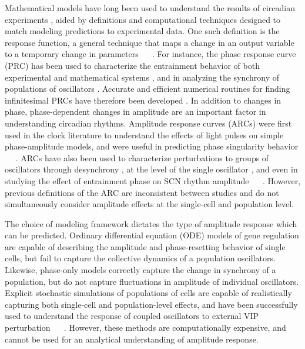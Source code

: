 \documentclass[11pt, letterpaper]{article}
\providecommand{\DIFadd}[1]{{\protect\color{blue}#1}} %
\providecommand{\DIFaddbegin}{} %
\providecommand{\DIFaddend}{} %
\begin{document}
Mathematical models have long been used to \DIFaddbegin \DIFadd{understand }\DIFaddend the results of circadian experiments \cite{Leloup2003, Becker-Weimann2004}\DIFaddbegin \DIFadd{, aided by definitions }\DIFaddend and computational techniques \DIFaddbegin \DIFadd{designed to match modeling predictions to experimental data.
One such definition is the response function, a general technique that maps a change in an output variable to a temporary change in parameters \mbox{%
\cite{Rand2004}
}%
}\DIFaddend .
For instance, the phase response curve (PRC) has been used to characterize the entrainment behavior of both experimental and mathematical systems \cite{Daan1976, Taylor2008, Pfeuty2011}, and in analyzing the synchrony of populations of oscillators \cite{Kim2014}.
\DIFaddbegin \DIFadd{Accurate and efficient numerical routines for finding infinitesimal PRCs }\DIFaddend have therefore been developed \cite{Kramer1984, Gunawan2006, Taylor2008a}.
In addition to changes in phase, phase-dependent changes in amplitude are \DIFaddbegin \DIFadd{an important factor }\DIFaddend in understanding circadian rhythms.
Amplitude response curves (ARCs) were first used in \DIFaddbegin \DIFadd{the clock literature }\DIFaddend to understand the effects of light pulses on simple phase-amplitude models, and were useful in predicting phase singularity behavior \DIFaddbegin \DIFadd{\mbox{%
\cite{Jewett1998}
}%
.
ARCs }\DIFaddend have also been used to characterize perturbations to groups of oscillators through desynchrony \cite{Achermann1999, Ukai2007}, at the level of the single oscillator \cite{VanderVeen2012, Castejon2013}\DIFaddbegin \DIFadd{, and even in studying the effect of entrainment phase on SCN rhythm amplitude \mbox{%
\cite{VanOosterhout2012}
}%
}\DIFaddend .
However, \DIFaddbegin \DIFadd{previous definitions of the ARC are inconsistent between studies and }\DIFaddend do not simultaneously consider amplitude effects at the \DIFaddbegin \DIFadd{single-cell }\DIFaddend and population level.

\DIFaddbegin \DIFadd{The choice of modeling framework dictates the type of amplitude response which can be predicted.
Ordinary differential equation (ODE) models of gene regulation are capable of describing the amplitude and phase-resetting behavior of single cells, but fail to capture the collective dynamics of a population oscillators.
Likewise, phase-only models correctly capture the change in synchrony of a population, but do not capture fluctuations in amplitude of individual oscillators.
Explicit stochastic simulations of populations of cells are capable of realistically capturing both single-cell and population-level effects, and have been successfully used to understand the response of coupled oscillators to external VIP perturbation \mbox{%
\cite{An2013}
}%
.
However, these methods are computationally expensive, and cannot be used for an analytical understanding of amplitude response.
}
\end{document}
